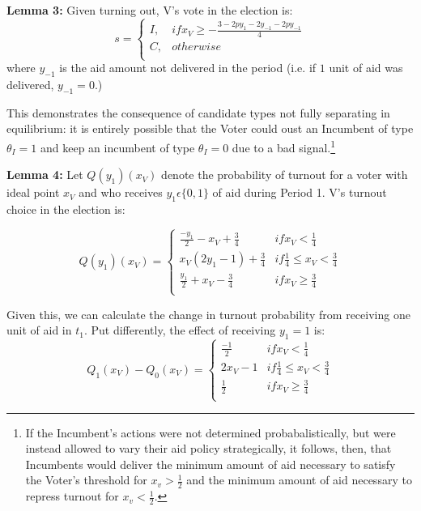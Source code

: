 \documentclass[12pt]{paper}
\begin{document}
\textbf{Lemma 3:}
Given turning out, V’s vote in the election is:
\begin{equation}
s =
\begin{cases}
I, & if x_V \geq -\frac{3 - 2py_1 - 2y_{-1} - 2py_{-1}}{4} \\    
C,     & otherwise  \\
\end{cases}
\end{equation}
where $y_{-1}$ is the aid amount not delivered in the period (i.e. if $1$ unit of aid was delivered, $y_{-1} = 0$.) 

This demonstrates the consequence of candidate types not fully separating in equilibrium: it is entirely possible that the Voter could oust an Incumbent of type $\theta_I = 1$ and keep an incumbent of type $\theta_I = 0$ due to a bad signal.\footnote{If the Incumbent's actions were not determined probabalistically, but were instead allowed to vary their aid policy strategically, it follows, then, that Incumbents would deliver the minimum amount of aid necessary to satisfy the Voter's threshold for $x_v > \frac{1}{2}$ and the minimum amount of aid necessary to repress turnout for $x_v < \frac{1}{2}$.}


\textbf{Lemma 4:} Let $Q(y_1 )(x_V )$ denote the probability of turnout for a voter with ideal point $x_V$ and who receives $y_1 \epsilon \{0,1\}$ of aid during Period 1. V’s turnout choice in the election is:

\begin{equation}
Q(y_1 )(x_V ) =
\begin{cases}
\frac{-y_1}{2} - x_V + \frac{3}{4} & if x_V < \frac{1}{4}\\    
x_V (2y_1 - 1) + \frac{3}{4}     & if \frac{1}{4} \leq x_V < \frac{3}{4}  \\
\frac{y_1}{2} + x_V - \frac{3}{4}     & if x_V \geq \frac{3}{4}  \\
\end{cases}
\end{equation}

Given this, we can calculate the change in turnout probability from receiving one unit of aid in $t_1$. Put differently, the effect of receiving $y_1 = 1$ is:
\begin{equation}
Q_1 (x_V ) - Q_0 (x_V )=
\begin{cases}
\frac{-1}{2} & if x_V < \frac{1}{4}\\    
2x_V - 1 & if \frac{1}{4} \leq x_V < \frac{3}{4}  \\
\frac{1}{2} & if x_V \geq \frac{3}{4}  \\
\end{cases}
\end{equation}
\end{document}
